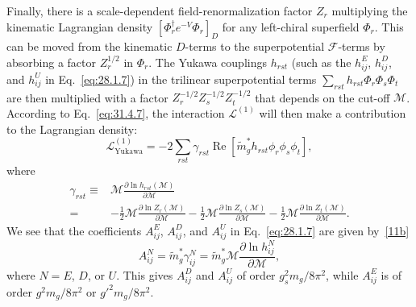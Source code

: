 Finally, there is a scale-dependent field-renormalization factor \(Z_r\)
multiplying the kinematic Lagrangian density
\([\Phi_r^\dagger e^{-V}\Phi_r]_D\) for any left-chiral superfield \(\Phi_r\).
This can be moved from the kinematic \(D\)-terms to the superpotential
\(\mathcal F\)-terms by absorbing a factor \(Z_r^{1/2}\) in \(\Phi_r\).
The Yukawa couplings \(h_{rst}\) (such as the \(h_{ij}^E\), \(h_{ij}^D\),
and \(h_{ij}^U\) in Eq.~\eqref{eq:28.1.7}) in the trilinear
superpotential terms \(\sum_{rst}h_{rst}\Phi_r\Phi_s\Phi_t\) are then
multiplied with a factor \(Z_r^{-1/2}Z_s^{-1/2}Z_t^{-1/2}\) that depends
on the cut-off \(\mathcal M\). According to Eq.~\eqref{eq:31.4.7}, the
interaction \(\mathcal L^{(1)}\) will then make a contribution to the
Lagrangian density:
\begin{equation}
  \mathcal L_{\mathrm{Yukawa}}^{(1)}
  =-2\sum_{rst}\gamma_{rst}\operatorname{Re}
  [\widetilde m_g^*h_{rst}\phi_r\phi_s\phi_t],
  \tag{31.4.18}\label{eq:31.4.18}
\end{equation}
where
\begin{equation}
  \begin{aligned}
  \gamma_{rst}
  \equiv{}&
  \mathcal M\frac{\partial\ln h_{rst}(\mathcal M)}
                   {\partial\mathcal M}
  \\
  ={}&
  -\frac12\mathcal M\frac{\partial\ln Z_r(\mathcal M)}
                            {\partial\mathcal M}
  -\frac12\mathcal M\frac{\partial\ln Z_s(\mathcal M)}
                            {\partial\mathcal M}
  -\frac12\mathcal M\frac{\partial\ln Z_t(\mathcal M)}
                            {\partial\mathcal M}.
  \end{aligned}
  \tag{31.4.19}\label{eq:31.4.19}
\end{equation}
We see that the coefficients \(A_{ij}^E\), \(A_{ij}^D\), and \(A_{ij}^U\)
in Eq.~\eqref{eq:28.1.7} are given
by~\hyperref[ch31-ref-11b]{[11b]}
\begin{equation}
  A_{ij}^N
  =\widetilde m_g^*\gamma_{ij}^N
  =\widetilde m_g^*\mathcal M
   \frac{\partial\ln h_{ij}^N}{\partial\mathcal M},
  \tag{31.4.20}\label{eq:31.4.20}
\end{equation}
where \(N=E\), \(D\), or \(U\). This gives \(A_{ij}^D\) and \(A_{ij}^U\)
of order \(g_s^2m_g/8\pi^2\), while \(A_{ij}^E\) is of order
\(g^2m_g/8\pi^2\) or \(g'^2m_g/8\pi^2\).
